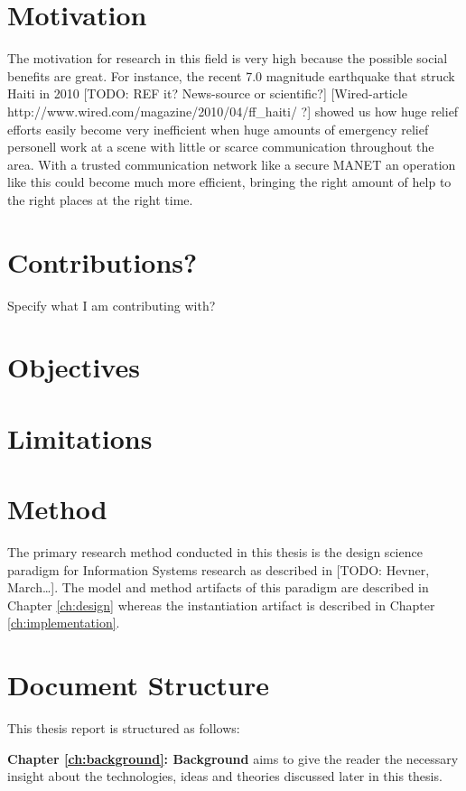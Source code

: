 \section{Motivation}
The motivation for research in this field is very high because the possible
social benefits are great. For instance, the recent 7.0 magnitude earthquake
that struck Haiti in 2010 [TODO: REF it? News-source or scientific?]
[Wired-article http://www.wired.com/magazine/2010/04/ff_haiti/ ?] showed us how
huge relief efforts easily become very inefficient when huge amounts of
emergency relief personell work at a scene with little or scarce communication
throughout the area. With a trusted communication network like a secure
\ac{MANET} an operation like this could become much more efficient, bringing the
right amount of help to the right places at the right time.

\section{Contributions?}
Specify what I am contributing with?

\section{Objectives}

\section{Limitations}

\section{Method}
The primary research method conducted in this thesis is the design science
paradigm for Information Systems research as described in [TODO: Hevner,
March\ldots]. The model and method artifacts of this paradigm are described in
Chapter \ref{ch:design} whereas the instantiation artifact is described in
Chapter \ref{ch:implementation}.

\section{Document Structure}
This thesis report is structured as follows:

\textbf{Chapter \ref{ch:background}: Background} aims to give the reader the
necessary insight about the technologies, ideas and theories discussed later in
this thesis.

